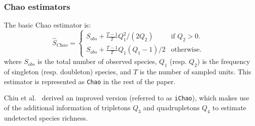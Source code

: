 \documentclass[sigconf,review,anonymous]{acmart}
\newcommand{\Chao}{Chao\xspace}
\newcommand{\chao}{$\hat{S}_\textit{Chao}$\xspace}
\newcounter{todocounter}
\newcommand{\todo}[1]{\marginpar{$|$}\textcolor{red}{\stepcounter{todocounter}\footnote[\thetodocounter]{\textcolor{red}{\textbf{TODO }}\textit{#1}}}}
\def\<#1>{\texttt{#1}}
\renewcommand{\todo}[1]{}
\begin{document}
\subsubsection{Chao estimators~\cite{chao1984nonparametric}}
The basic \Chao estimator
is: %
\begin{displaymath}
\text{\chao}=\begin{cases}
    S_{\textit{obs}} + \frac{T-1}{T} Q_1^2/(2Q_2) & \text{if $Q_2>0$}.\\
    S_{\textit{obs}} + \frac{T-1}{T} Q_1(Q_1-1)/2 & \text{otherwise}.
  \end{cases}
\end{displaymath}
where 
$S_{\textit{obs}}$ is the total number of observed species,
$Q_1$ (resp. $Q_2$) is the frequency of singleton (resp. doubleton) species,
and $T$ is the number of sampled units.
This estimator is represented as \<\Chao>
in the rest of the paper.


Chiu et al.~\cite{chiu2014improved} derived an improved version (referred to as \<iChao>), which makes use of the additional
information of tripletons $Q_3$ and quadrupletons $Q_4$ to estimate undetected species richness.
\end{document}
